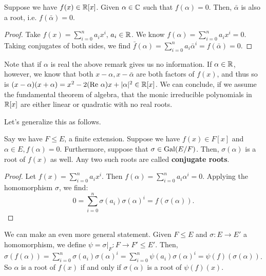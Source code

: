 \documentclass{../mathnotes}
\begin{document}
\begin{rem}
    Suppose we have $f(x)\in\mathbb{R}[x]$. Given $\alpha\in\mathbb{C}$ such that $f(\alpha)=0$. Then, $\bar \alpha$ is also a root,
    i.e. $f(\bar \alpha)=0$.
\end{rem}
\begin{proof}
    Take $f(x)=\sum_{i=0}^na_ix^i$, $a_i\in\mathbb{R}$. We know $f(\alpha)=\sum_{i=0}^na_ix^i=0$. Taking conjugates of both sides,
    we find $\bar{f}(\alpha)=\sum_{i=0}^na_i\bar\alpha^i=f(\bar\alpha)=0$.
\end{proof}

Note that if $\alpha$ is real the above remark gives us no information. If $\alpha\in\mathbb{R}$, however, we know that both
$x-\alpha,x-\bar\alpha$ are both factors of $f(x)$, and thus so is $(x-\alpha)(x+\alpha)=x^2-2(\text{Re }\alpha)x+|\alpha|^2\in\mathbb{R}[x]$.
We can conclude, if we assume the fundamental theorem of algebra, that the monic irreducible polynomials in $\mathbb{R}[x]$ are
either linear or quadratic with no real roots.

Let's generalize this as follows.
\begin{thm}
 Say we have $F\leq E$, a finite extension. Suppose we have $f(x)\in F[x]$ and $\alpha\in E, f(\alpha)=0$.
Furthermore, suppose that $\sigma\in\operatorname{Gal}(E/F)$. Then, $\sigma(\alpha)$ is a root of $f(x)$ as well. Any two such
roots are called \textbf{conjugate roots}.
\end{thm}
\begin{proof}
    Let $f(x)=\sum_{i=0}^na_ix^i$. Then $f(\alpha)=\sum_{i=0}^na_i\alpha^i=0$. Applying the homomorphism $\sigma$, we find:
    \[0=\sum_{i=0}^n\sigma(a_i)\sigma(\alpha)^i=f(\sigma(\alpha)).\]
\end{proof}

We can make an even more general statement. Given $F\leq E$ and $\sigma:E\to E'$ a homomorphism, we define $\psi=\sigma|_F:F\to F'\leq E'$.
Then, $\sigma(f(\alpha))=\sum_{i=0}^n\sigma(a_i)\sigma(\alpha)^i=\sum_{i=0}^n\psi(a_i)\sigma(\alpha)^i=\psi(f)(\sigma(\alpha))$.
So $\alpha$ is a root of $f(x)$ if and only if $\sigma(\alpha)$ is a root of $\psi(f)(x)$.
\end{document}
